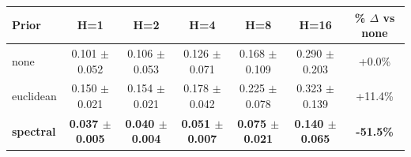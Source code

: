 \begin{tabular}{lcccccc}
\toprule
Prior & H=1 & H=2 & H=4 & H=8 & H=16 & \% $\Delta$ vs none \\
\midrule
none & 0.101 $\pm$ 0.052 & 0.106 $\pm$ 0.053 & 0.126 $\pm$ 0.071 & 0.168 $\pm$ 0.109 & 0.290 $\pm$ 0.203 & +0.0\% \\
euclidean & 0.150 $\pm$ 0.021 & 0.154 $\pm$ 0.021 & 0.178 $\pm$ 0.042 & 0.225 $\pm$ 0.078 & 0.323 $\pm$ 0.139 & +11.4\% \\
\textbf{spectral} & \textbf{0.037 $\pm$ 0.005} & \textbf{0.040 $\pm$ 0.004} & \textbf{0.051 $\pm$ 0.007} & \textbf{0.075 $\pm$ 0.021} & \textbf{0.140 $\pm$ 0.065} & \textbf{-51.5\%} \\
\bottomrule
\end{tabular}
